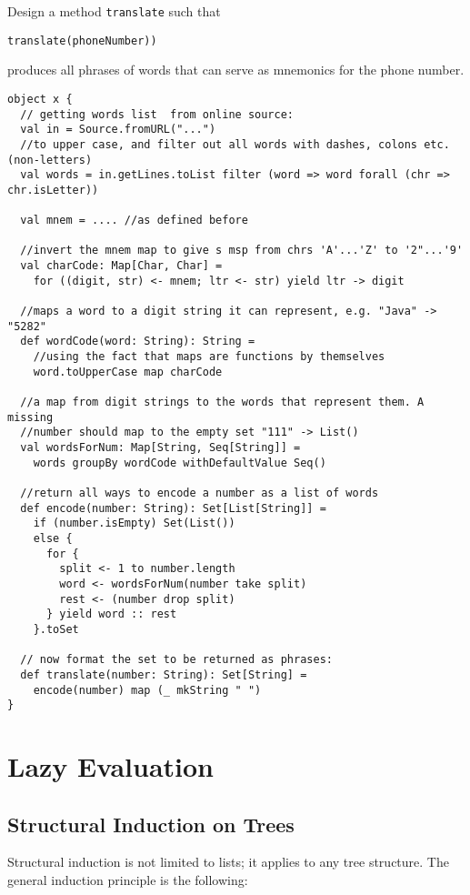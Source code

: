 \documentclass{scrartcl}
\begin{document}
Design a method \lstinline|translate| such that
\begin{lstlisting}
translate(phoneNumber))
\end{lstlisting}
produces all phrases of words that can serve as mnemonics for the phone number.

\begin{lstlisting}
object x {
  // getting words list  from online source:
  val in = Source.fromURL("...")
  //to upper case, and filter out all words with dashes, colons etc. (non-letters)
  val words = in.getLines.toList filter (word => word forall (chr => chr.isLetter))

  val mnem = .... //as defined before

  //invert the mnem map to give s msp from chrs 'A'...'Z' to '2"...'9'
  val charCode: Map[Char, Char] =
    for ((digit, str) <- mnem; ltr <- str) yield ltr -> digit

  //maps a word to a digit string it can represent, e.g. "Java" -> "5282"
  def wordCode(word: String): String =
    //using the fact that maps are functions by themselves
    word.toUpperCase map charCode

  //a map from digit strings to the words that represent them. A missing
  //number should map to the empty set "111" -> List()
  val wordsForNum: Map[String, Seq[String]] =
    words groupBy wordCode withDefaultValue Seq()

  //return all ways to encode a number as a list of words
  def encode(number: String): Set[List[String]] =
    if (number.isEmpty) Set(List())
    else {
      for {
        split <- 1 to number.length
        word <- wordsForNum(number take split)
        rest <- (number drop split)
      } yield word :: rest
    }.toSet

  // now format the set to be returned as phrases:
  def translate(number: String): Set[String] =
    encode(number) map (_ mkString " ")
}
\end{lstlisting}

\section{Lazy Evaluation}
\label{sec:LazyEvaluation}
\subsection{Structural Induction on Trees}
\label{sec:StructuralInduction}
Structural induction is not limited to lists; it applies to any tree structure.
The general induction principle is the following:
\end{document}
